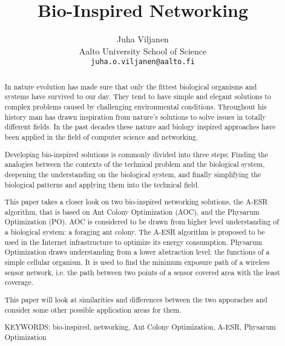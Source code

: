 \documentclass{IWORK2014}
\begin{document}

\title{Bio-Inspired Networking}

\author{Juha Viljanen\\
        Aalto University School of Science \\
	\texttt{juha.o.viljanen@aalto.fi}}
\maketitle


\begin{abstract}
In nature evolution has made sure that only the fittest biological organisms and systems have survived to our day. They tend to have simple and elegant solutions to complex problems caused by challenging environmental conditions. Throughout his history man has drawn inspiration from nature's solutions to solve issues in totally different fields. In the past decades these nature and biology inspired approaches have been applied in the field of computer science and networking.

Developing bio-inspired solutions is commonly divided into three steps: Finding the analogies between the contexts of the technical problem and the biological system, deepening the understanding on the biological system, and finally simplifying the biological patterns and applying them into the technical field.

This paper takes a closer look on two bio-inspired networking solutions, the A-ESR algorithm, that is based on Ant Colony Optimization (AOC), and the Physarum Optimization (PO). AOC is considered to be drawn from higher level understanding of a biological system: a foraging ant colony. The A-ESR algorithm is proposed to be used in the Internet infrastructure to optimize its energy consumption. Physarum Optimization draws understanding from a lower abstraction level: the functions of a simple cellular organism. It is used to find the minimum exposure path of a wireless sensor network, i.e. the path between two points of a sensor covered area with the least coverage.

This paper will look at similarities and differences between the two apporaches and consider some other possible application areas for them.

\vspace{3mm}
\noindent KEYWORDS: bio-inspired, networking, Ant Colony Optimization, A-ESR, Physarum Optimization

\end{abstract}
\end{document}

